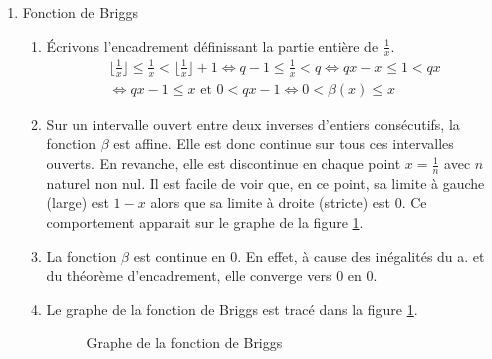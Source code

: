 \begin{enumerate}
\begin{enumerate}
On peut d{\'e}finir sur $\mathcal{T}$ une relation d'ordre lexicographique, cette application devient alors strictement croissante. 
Si $x$ est un r{\'e}el donn{\'e}, la suite $(q_{n})_{n\in \N^{*}}$ telle que $(s_{n})_{n\in \N^{*}}$ converge vers $x$ est enti{\`e}rement d{\'e}termin{\'e}e par les formules de la question 2.b. On l'appelle le \emph{ développement de Engel} de $x$.

\end{enumerate}

\item Fonction de Briggs
\begin{enumerate}
 \item \'Ecrivons l'encadrement définissant la partie entière de $\frac{1}{x}$.
\begin{multline*}
 \lfloor\frac{1}{x}\rfloor \leq \frac{1}{x}<\lfloor \frac{1}{x}\rfloor +1
\Leftrightarrow q-1\leq \frac{1}{x} < q
\Leftrightarrow qx-x\leq 1 < qx\\
\Leftrightarrow qx-1\leq x\text{ et } 0<qx-1
\Leftrightarrow 0<\beta(x)\leq x
\end{multline*}
\item Sur un intervalle ouvert entre deux inverses d'entiers consécutifs, la fonction $\beta$ est affine. Elle est donc continue sur tous ces intervalles ouverts. En revanche, elle est discontinue en chaque point $x=\frac{1}{n}$ avec $n$ naturel non nul. Il est facile de voir que, en ce point, sa limite à gauche (large) est $1-x$ alors que sa limite à droite (stricte) est $0$. Ce comportement apparait sur le graphe de la figure \ref{fig:Cengel_1}.
\item La fonction $\beta$ est continue en $0$. En effet, à cause des inégalités du a. et du théorème d'encadrement, elle converge vers $0$ en $0$. 
\item Le graphe de la fonction de Briggs est tracé dans la figure \ref{fig:Cengel_1}.
\begin{figure}
 \centering
 
 \caption{Graphe de la fonction de Briggs}
 \label{fig:Cengel_1}
\end{figure}
\end{enumerate}


\end{enumerate}
